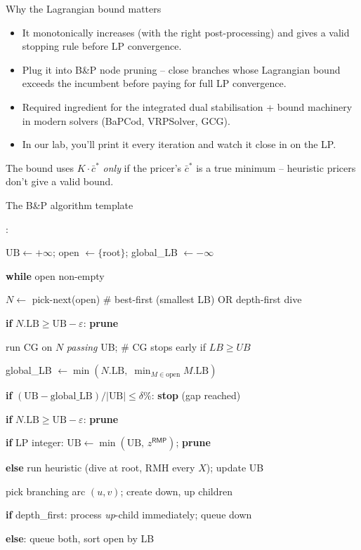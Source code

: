 \documentclass[10pt,aspectratio=169]{beamer}
\newcounter{algoline}
\newenvironment{algo}[1][Algorithm]{%
  \setcounter{algoline}{0}%
  \begin{tcolorbox}[colback=soft,colframe=accent2!70,sharp corners,
      boxrule=0.4pt,left=4pt,right=4pt,top=2pt,bottom=2pt,
      title=\textbf{#1}]%
  \ttfamily\small
  \begin{list}{\stepcounter{algoline}\textcolor{accent2}{\scriptsize\arabic{algoline}:}}%
    {\setlength{\leftmargin}{2.0em}\setlength{\itemsep}{0.1em}\setlength{\topsep}{0pt}}%
}{%
  \end{list}\end{tcolorbox}%
}
\newcommand{\Indent}{\hspace*{1.2em}}
\newcommand{\rmp}{\mathsf{RMP}}
\newcommand{\redcost}{\bar{c}}
\begin{document}
\begin{frame}{Why the Lagrangian bound matters}
  \begin{itemize}\small
    \item It \alert{monotonically increases} (with the right post-processing)
          and gives a valid stopping rule before LP convergence.
    \item Plug it into B\&P node pruning -- close branches whose Lagrangian
          bound exceeds the incumbent before paying for full LP convergence.
    \item Required ingredient for the \alert{integrated} dual stabilisation
          + bound machinery in modern solvers (BaPCod, VRPSolver, GCG).
    \item In our lab, you'll print it every iteration and watch it close in
          on the LP.
  \end{itemize}
  \vfill
  \begin{warnbox}
    The bound uses $K\cdot\redcost^*$ \emph{only} if the pricer's
    $\redcost^*$ is a \alert{true} minimum -- heuristic pricers don't give a
    valid bound.
  \end{warnbox}
\end{frame}

\begin{frame}{The B\&P algorithm template}
\begin{algo}[Branch-and-price]
\item $\text{UB}\leftarrow +\infty$;\;\; open $\leftarrow\{$root$\}$;\;\; global\_LB $\leftarrow -\infty$
\item \textbf{while} open non-empty
\item \Indent $N \leftarrow$ pick-next(open) \quad\textcolor{accent2}{\# best-first (smallest LB) OR depth-first dive}
\item \Indent \textbf{if} $N.\text{LB}\ge\text{UB}-\varepsilon$: \textbf{prune}
\item \Indent run CG on $N$ \emph{passing} UB;\; \quad\textcolor{accent2}{\# CG stops early if $LB\ge UB$}
\item \Indent global\_LB $\leftarrow \min(N.\text{LB},\;\min_{M\in\text{open}} M.\text{LB})$
\item \Indent \textbf{if} $(\text{UB}-\text{global\_LB})/|\text{UB}|\le\delta\%$: \textbf{stop} (gap reached)
\item \Indent \textbf{if} $N.\text{LB}\ge\text{UB}-\varepsilon$: \textbf{prune}
\item \Indent \textbf{if} LP integer: $\text{UB}\leftarrow\min(\text{UB},\,z^{\rmp})$; \textbf{prune}
\item \Indent \textbf{else} run heuristic (dive at root, RMH every $X$); update UB
\item \Indent pick branching arc $(u,v)$; create down, up children
\item \Indent \textbf{if} depth\_first: process \emph{up}-child immediately; queue down
\item \Indent \textbf{else}: queue both, sort open by LB
\end{algo}
\end{frame}
\end{document}
